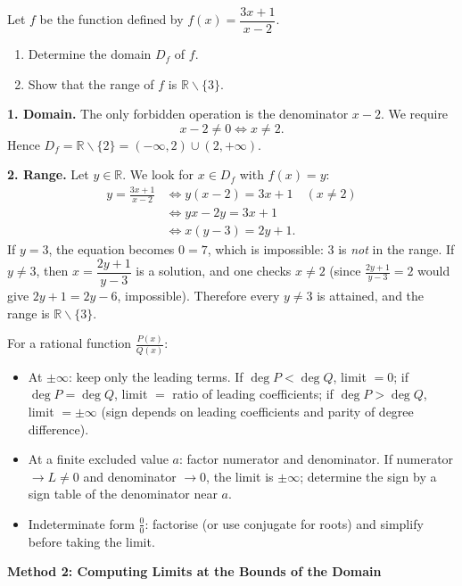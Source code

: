 \documentclass[11pt]{article}
\def\setminus{\mathbin{\backslash}}\let\smallsetminus\setminus
\begin{document}
\begin{exoresolu}
Let $f$ be the function defined by $f(x)=\dfrac{3x+1}{x-2}$.
\begin{enumerate}
\item Determine the domain $D_f$ of $f$.
\item Show that the range of $f$ is $\mathbb{R}\setminus\{3\}$.
\end{enumerate}
\tcblower
\textbf{1. Domain.} The only forbidden operation is the denominator $x-2$. We require
\[ x-2\neq 0 \iff x\neq 2. \]
Hence $D_f=\mathbb{R}\setminus\{2\}=(-\infty,2)\cup(2,+\infty)$.

\textbf{2. Range.} Let $y\in\mathbb{R}$. We look for $x\in D_f$ with $f(x)=y$:
\begin{align*}
y=\frac{3x+1}{x-2} &\iff y(x-2)=3x+1 \quad (x\neq 2)\\
&\iff yx-2y=3x+1\\
&\iff x(y-3)=2y+1.
\end{align*}
If $y=3$, the equation becomes $0=7$, which is impossible: $3$ is \emph{not} in the range. If $y\neq 3$, then $x=\dfrac{2y+1}{y-3}$ is a solution, and one checks $x\neq 2$ (since $\frac{2y+1}{y-3}=2$ would give $2y+1=2y-6$, impossible). Therefore every $y\neq 3$ is attained, and the range is $\mathbb{R}\setminus\{3\}$.
\end{exoresolu}

\begin{aretenir}
For a rational function $\frac{P(x)}{Q(x)}$:
\begin{itemize}
\item At $\pm\infty$: keep only the leading terms. If $\deg P < \deg Q$, limit $=0$; if $\deg P = \deg Q$, limit $=$ ratio of leading coefficients; if $\deg P > \deg Q$, limit $=\pm\infty$ (sign depends on leading coefficients and parity of degree difference).
\item At a finite excluded value $a$: factor numerator and denominator. If numerator $\to L\neq0$ and denominator $\to0$, the limit is $\pm\infty$; determine the sign by a sign table of the denominator near $a$.
\item Indeterminate form $\frac{0}{0}$: factorise (or use conjugate for roots) and simplify before taking the limit.
\end{itemize}
\end{aretenir}

\textbf{Method 2: Computing Limits at the Bounds of the Domain}\par
\end{document}
